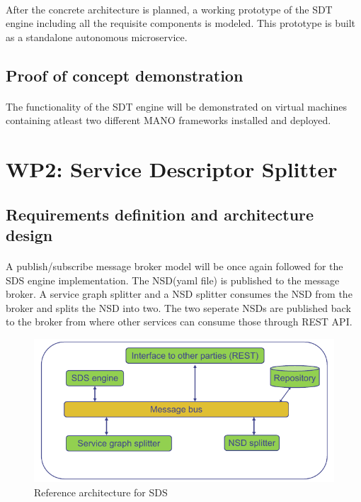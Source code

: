 \paragraph{}
After the concrete architecture is planned, a working prototype of the SDT engine including all the requisite components is modeled. This prototype is built as a standalone autonomous microservice.
\subsection{Proof of concept demonstration}
\paragraph{}
The functionality of the SDT engine will be demonstrated on virtual machines containing atleast two different MANO frameworks installed and deployed. 

\section{WP2: Service Descriptor Splitter}

\subsection{Requirements definition and architecture design}
\paragraph{}
  A publish/subscribe message broker model will be once again followed for the SDS engine implementation. The NSD(yaml file) is published to the message broker. A service graph splitter and a NSD splitter consumes the NSD from the broker and splits the NSD into two. The two seperate NSDs are published back to the broker from where other services can consume those through REST API.
\begin{figure}[h]
	\centering
	\includegraphics[width=0.9\linewidth]{figures/wp2Arch}
	\caption{Reference architecture for SDS \cite{WPDescriptionsPDF}}
	\label{fig:wp2arch}
\end{figure}

